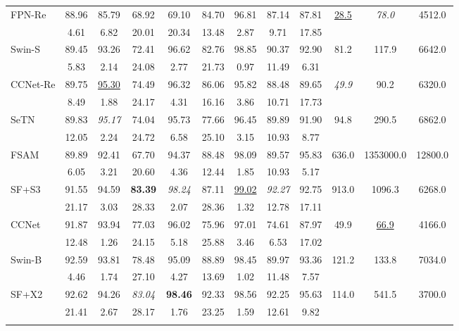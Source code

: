 \documentclass[preprint,12pt]{elsarticle}
\begin{document}
\begin{table}[!htbp]
\begin{tabular}{lccccccccccc}
\rowcolor{gray!12}
FPN-Re & 88.96 & 85.79 & 68.92 & 69.10 & 84.70 & 96.81 & 87.14 & 87.81 & \uline{28.5} & \textit{78.0} & 4512.0 \\
  & 4.61 & 6.82 & 20.01 & 20.34 & 13.48 & 2.87 & 9.71 & 17.85 &  &  &  \\ \addlinespace[2pt]
Swin-S & 89.45 & 93.26 & 72.41 & 96.62 & 82.76 & 98.85 & 90.37 & 92.90 & 81.2 & 117.9 & 6642.0 \\
  & 5.83 & 2.14 & 24.08 & 2.77 & 21.73 & 0.97 & 11.49 & 6.31 &  &  &  \\ \addlinespace[2pt]
\rowcolor{gray!12}
CCNet-Re & 89.75 & \uline{95.30} & 74.49 & 96.32 & 86.06 & 95.82 & 88.48 & 89.65 & \textit{49.9} & 90.2 & 6320.0 \\
  & 8.49 & 1.88 & 24.17 & 4.31 & 16.16 & 3.86 & 10.71 & 17.73 &  &  &  \\ \addlinespace[2pt]
SeTN & 89.83 & \textit{95.17} & 74.04 & 95.73 & 77.66 & 96.45 & 89.89 & 91.90 & 94.8 & 290.5 & 6862.0 \\
  & 12.05 & 2.24 & 24.72 & 6.58 & 25.10 & 3.15 & 10.93 & 8.77 &  &  &  \\ \addlinespace[2pt]
\rowcolor{gray!12}
FSAM & 89.89 & 92.41 & 67.70 & 94.37 & 88.48 & 98.09 & 89.57 & 95.83 & 636.0 & 1353000.0 & 12800.0 \\
  & 6.05 & 3.21 & 20.60 & 4.36 & 12.44 & 1.85 & 10.93 & 5.17 &  &  &  \\ \addlinespace[2pt]
SF+S3 & 91.55 & 94.59 & \textbf{83.39} & \textit{98.24} & 87.11 & \uline{99.02} & \textit{92.27} & 92.75 & 913.0 & 1096.3 & 6268.0 \\
  & 21.17 & 3.03 & 28.33 & 2.07 & 28.36 & 1.32 & 12.78 & 17.11 &  &  &  \\ \addlinespace[2pt]
\rowcolor{gray!12}
CCNet & 91.87 & 93.94 & 77.03 & 96.02 & 75.96 & 97.01 & 74.61 & 87.97 & 49.9 & \uline{66.9} & 4166.0 \\
  & 12.48 & 1.26 & 24.15 & 5.18 & 25.88 & 3.46 & 6.53 & 17.02 &  &  &  \\ \addlinespace[2pt]
Swin-B & 92.59 & 93.81 & 78.48 & 95.09 & 88.89 & 98.45 & 89.97 & 93.36 & 121.2 & 133.8 & 7034.0 \\
  & 4.46 & 1.74 & 27.10 & 4.27 & 13.69 & 1.02 & 11.48 & 7.57 &  &  &  \\ \addlinespace[2pt]
\rowcolor{gray!12}
SF+X2 & 92.62 & 94.26 & \textit{83.04} & \textbf{98.46} & 92.33 & 98.56 & 92.25 & 95.63 & 114.0 & 541.5 & 3700.0 \\
  & 21.41 & 2.67 & 28.17 & 1.76 & 23.25 & 1.59 & 12.61 & 9.82 &  &  &  \\ \addlinespace[2pt]

\end{tabular}
\end{table}
\end{document}
